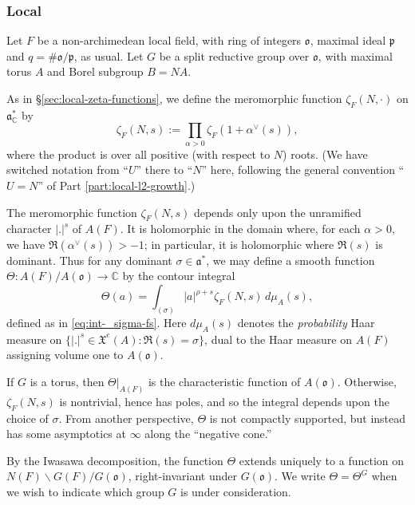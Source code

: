 \subsubsection{Local}\label{sec:basic-vectors-local}
Let $F$ be a non-archimedean local field, with ring of integers $\mathfrak{o}$, maximal ideal $\mathfrak{p}$ and $q = \# \mathfrak{o} / \mathfrak{p}$, as usual.  Let $G$ be a split reductive group over $\mathfrak{o}$, with maximal torus $A$ and Borel subgroup $B = N A$.

As in \S\ref{sec:local-zeta-functions}, we define the meromorphic function $\zeta_F(N,\cdot)$ on $\mathfrak{a}_{\mathbb{C}}^*$ by
\begin{equation*}
  \zeta_F(N,s) := \prod_{\alpha > 0} \zeta_F(1 + \alpha^\vee(s)),
\end{equation*}
where the product is over all positive (with respect to $N$) roots.  (We have switched notation from ``$U$'' there to ``$N$'' here, following the general convention ``$U = N$'' of Part \ref{part:local-l2-growth}.)

The meromorphic function $\zeta_F(N,s)$ depends only upon the unramified character $|.|^s$ of $A(F)$.  It is holomorphic in the domain where, for each $\alpha > 0$, we have $\Re(\alpha^\vee(s)) > -1$; in particular, it is holomorphic where $\Re(s)$ is dominant.  Thus for any dominant $\sigma \in \mathfrak{a}^*$, we may define a smooth function $\Theta : A(F) / A(\mathfrak{o}) \rightarrow \mathbb{C}$ by the contour integral 
\begin{equation*}
  \Theta(a) = \int_{(\sigma)} |a|^{\rho + s} \zeta_F(N,s) \, d \mu_{A}(s),
\end{equation*}
defined as in \eqref{eq:int-_sigma-fs}.  Here $d \mu_{A}(s)$ denotes the \emph{probability} Haar measure on $\{|.|^s \in \mathfrak{X}^e(A) : \Re(s)  = \sigma \}$, dual to the Haar measure on $A(F)$ assigning volume one to $A(\mathfrak{o})$.

If $G$ is a torus, then $\Theta|_{A(F)}$ is the characteristic function of $A(\mathfrak{o})$.  Otherwise, $\zeta_F(N,s)$ is nontrivial, hence has poles, and so the integral depends upon the choice of $\sigma$.  From another perspective, $\Theta$ is not compactly supported, but instead has some asymptotics at $\infty$ along the ``negative cone.''

By the Iwasawa decomposition, the function $\Theta$ extends uniquely to a function on $N(F) \backslash G(F) / G(\mathfrak{o})$, right-invariant under $G(\mathfrak{o})$.  We write $\Theta = \Theta^G$ when we wish to indicate which group $G$ is under consideration.

